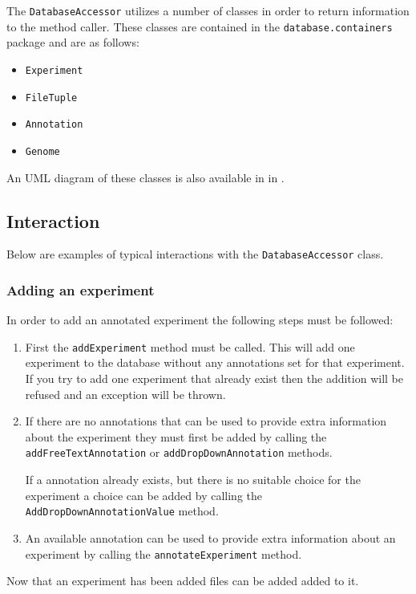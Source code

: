 The \texttt{DatabaseAccessor} utilizes a number of classes in order to return information to the method caller. These classes are contained in the \texttt{database.containers} package and are as follows:
\begin{itemize}
\item \texttt{Experiment}
\item \texttt{FileTuple}
\item \texttt{Annotation}
\item \texttt{Genome}
\end{itemize}

An UML diagram of these classes is also available in  in .

\subsection{Interaction}
Below are examples of typical interactions with the \texttt{DatabaseAccessor} class.

\subsubsection{Adding an experiment}
In order to add an annotated experiment the following steps must be followed:
\begin{enumerate}
\item First the \texttt{addExperiment} method must be called. This will add one experiment to the database without any annotations set for that experiment. If you try to add one experiment that already exist then the addition will be refused and an exception will be thrown.

\item If there are no annotations that can be used to provide extra information about the experiment they must first be added by calling the \texttt{addFreeTextAnnotation} or \texttt{addDropDownAnnotation} methods.

\subitem If a  annotation already exists, but there is no suitable choice for the experiment a choice can be added by calling the \texttt{AddDropDownAnnotationValue} method.

\item An available annotation can be used to provide extra information about an experiment by calling the \texttt{annotateExperiment} method.
\end{enumerate}

Now that an experiment has been added files can be added added to it.

